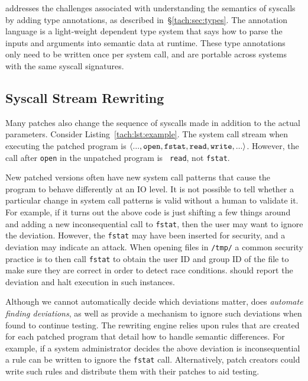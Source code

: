 \tachyon addresses the challenges associated with understanding the
semantics of syscalls by adding type annotations, as described in~\S\ref{tach:sec:types}. The \tachyon 
annotation language is a light-weight dependent type system that says
how to parse the inputs and arguments into semantic data at runtime.
These type annotations only need to be written once per system call,
and are portable across systems with the same syscall signatures.

\subsection{Syscall Stream Rewriting}


Many patches also change the sequence of syscalls made in addition to
the actual parameters.  Consider Listing~\ref{tach:lst:example}.  The
system call stream when executing the patched program is $\langle ...,
{\tt open}, {\tt fstat}, {\tt read}, {\tt write}, ...\rangle$.
However, the call after {\tt open}  in the unpatched program is {\tt
  read}, not {\tt fstat}.  




New patched versions often have new system call patterns that cause
the program to behave differently at an IO level. It is not possible
to tell whether a particular change in system call patterns is valid
without a human to validate it. For example, if it turns out the
above code is just shifting a few things around and adding a new
inconsequential call to \texttt{fstat}, then the user may want to
ignore the deviation.  However, the \texttt{fstat} may have been
inserted for security, and a deviation may indicate an attack.  When
opening files in \texttt{/tmp/} a common security practice is to
then call \texttt{fstat} to obtain the user ID and group ID of the
file to make sure they are correct in order to detect race
conditions. \tachyon should report the deviation and halt execution in
such instances. 

Although we cannot automatically decide which deviations matter,
\tachyon does \emph{automate finding deviations}, as well as provide a
mechanism to ignore such deviations when found to continue testing.
The rewriting engine relies upon rules that are created for each
patched program that detail how to handle semantic differences. For
example, if a system administrator decides the above deviation is
inconsequential a rule can be written to ignore the {\tt fstat} call.
Alternatively, patch creators could write such rules and distribute
them with their patches to aid testing.

